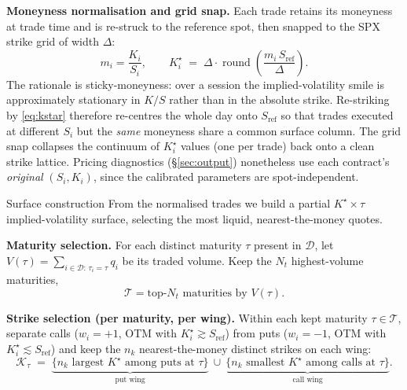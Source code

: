 \documentclass[a4paper, 11pt, reqno]{amsart}
\makeatletter
\def\section{\@startsection{section}{1}%
  \z@{.7\linespacing\@plus\linespacing}{.5\linespacing}%
  {\normalfont\bfseries\centering}}
\DeclareMathOperator{\round}{round}
\makeatother
\begin{document}
		\textbf{Moneyness normalisation and grid snap.} Each trade retains its moneyness at
		trade time and is re-struck to the reference spot, then snapped to the SPX strike grid of
		width $\Delta$:
		\begin{equation}\label{eq:kstar}
			m_i = \frac{K_i}{S_i},
			\qquad
			K^\star_i \;=\; \Delta \cdot \round\!\left( \frac{m_i\, S_{\mathrm{ref}}}{\Delta} \right).
		\end{equation}
		The rationale is sticky-moneyness: over a session the implied-volatility smile is
		approximately stationary in $K/S$ rather than in the absolute strike. Re-striking by
		\eqref{eq:kstar} therefore re-centres the whole day onto $S_{\mathrm{ref}}$ so that trades
		executed at different $S_i$ but the \emph{same} moneyness share a common surface column.
		The grid snap collapses the continuum of $K^\star_i$ values (one per trade) back onto a
		clean strike lattice. Pricing diagnostics (\S\ref{sec:output}) nonetheless use each
		contract's \emph{original} $(S_i,K_i)$, since the calibrated parameters are spot-independent.

	\section{Surface construction}\label{sec:surface}
		From the normalised trades we build a partial $K^\star \times \tau$ implied-volatility
		surface, selecting the most liquid, nearest-the-money quotes.
	
		\textbf{Maturity selection.} For each distinct maturity $\tau$ present in $\mathcal{D}$,
		let $V(\tau)=\sum_{i\in\mathcal{D}:\,\tau_i=\tau} q_i$ be its traded volume. Keep the
		$N_t$ highest-volume maturities,
		\begin{equation}
			\mathcal{T} = \text{top-}N_t \text{ maturities by } V(\tau).
		\end{equation}
	
		\textbf{Strike selection (per maturity, per wing).} Within each kept maturity
		$\tau\in\mathcal{T}$, separate calls ($w_i=+1$, OTM with $K^\star_i \gtrsim S_{\mathrm{ref}}$)
		from puts ($w_i=-1$, OTM with $K^\star_i \lesssim S_{\mathrm{ref}}$) and keep the $n_k$
		nearest-the-money distinct strikes on each wing:
		\begin{equation}
			\mathcal{K}_\tau \;=\;
			\underbrace{\bigl\{\text{$n_k$ largest } K^\star \text{ among puts at } \tau\bigr\}}_{\text{put wing}}
			\ \cup\
			\underbrace{\bigl\{\text{$n_k$ smallest } K^\star \text{ among calls at } \tau\bigr\}}_{\text{call wing}} .
		\end{equation}
	
\end{document}
